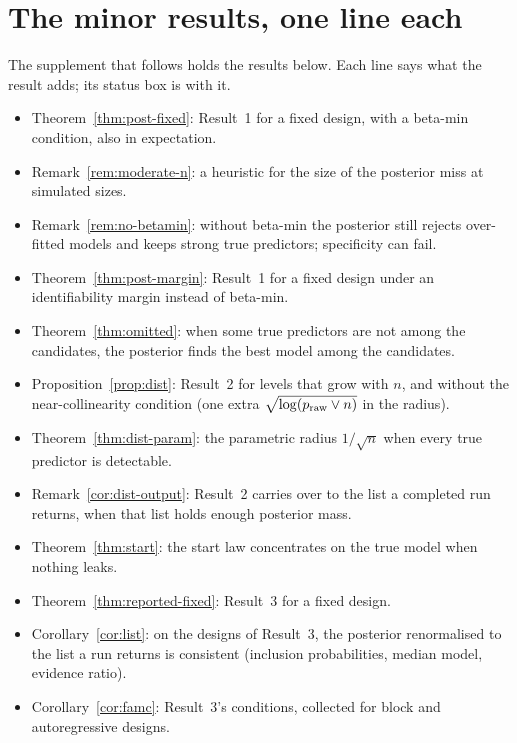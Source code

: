 \section*{The minor results, one line each}\label{sec:supp-index}

The supplement that follows holds the results below. Each line says what the result adds; its status box is with it.
\begin{itemize}[leftmargin=1.5em,itemsep=1pt]
  \item Theorem~\ref{thm:post-fixed}: Result~1 for a fixed design, with a beta-min condition, also in expectation.
  \item Remark~\ref{rem:moderate-n}: a heuristic for the size of the posterior miss at simulated sizes.
  \item Remark~\ref{rem:no-betamin}: without beta-min the posterior still rejects over-fitted models and keeps strong
    true predictors; specificity can fail.
  \item Theorem~\ref{thm:post-margin}: Result~1 for a fixed design under an identifiability margin instead of beta-min.
  \item Theorem~\ref{thm:omitted}: when some true predictors are not among the candidates, the posterior finds the best
    model among the candidates.
  \item Proposition~\ref{prop:dist}: Result~2 for levels that grow with $n$, and without the near-collinearity condition
    (one extra $\sqrt{\log(p_{\mathrm{raw}}\vee n)}$ in the radius).
  \item Theorem~\ref{thm:dist-param}: the parametric radius $1/\sqrt n$ when every true predictor is detectable.
  \item Remark~\ref{cor:dist-output}: Result~2 carries over to the list a completed run returns, when that list holds
    enough posterior mass.
  \item Theorem~\ref{thm:start}: the start law concentrates on the true model when nothing leaks.
  \item Theorem~\ref{thm:reported-fixed}: Result~3 for a fixed design.
  \item Corollary~\ref{cor:list}: on the designs of Result~3, the posterior renormalised to the list a run returns is
    consistent (inclusion probabilities, median model, evidence ratio).
  \item Corollary~\ref{cor:famc}: Result~3's conditions, collected for block and autoregressive designs.

\end{itemize}
